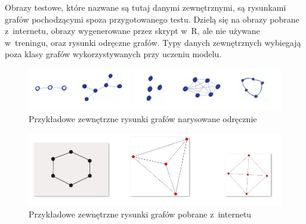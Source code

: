 Obrazy testowe, które nazwane są tutaj danymi zewnętrznymi, są rysunkami grafów pochodzącymi spoza przygotowanego testu.
Dzielą się na obrazy pobrane z~internetu, obrazy wygenerowane przez skrypt w~R, ale nie używane w~treningu,
oraz rysunki odręczne grafów. Typy danych zewnętrznych wybiegają poza klasy grafów wykorzystywanych przy uczeniu modelu.

\begin{figure}[ht]
	\centering
	\includegraphics[width=15.5cm]{resources/model/images/ext-graphs-drawn.png}
	\caption{Przykładowe zewnętrzne rysunki grafów narysowane odręcznie}
	\label{Fig:tests-outside-1}
\end{figure}
\FloatBarrier

\begin{figure}[ht]
	\centering
	\includegraphics[width=15cm]{resources/model/images/ext-graphs-internet.png}
	\caption{Przykładowe zewnętrzne rysunki grafów pobrane z~internetu}
	\label{Fig:tests-outside-2}
\end{figure}
\FloatBarrier